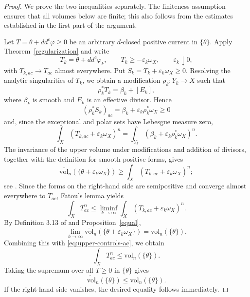 \documentclass[10pt,a4paper]{amsart}
\begin{document}
\begin{proof}
We prove the two inequalities separately. The finiteness assumption ensures that all volumes below are finite; this also follows from the estimates established in the first part of the argument.

Let $T=\theta+dd^c\varphi\ge0$ be an arbitrary $d$-closed positive current in
$\{\theta\}$. Apply Theorem~\ref{regularization} and write
\[
 T_k=\theta+dd^c\varphi_k,\qquad
 T_k\ge-\varepsilon_k\omega_X,\qquad
 \varepsilon_k\downarrow0,
\]
with $T_{k,ac}\to T_{ac}$ almost everywhere. Put
$S_k=T_k+\varepsilon_k\omega_X\ge0$. Resolving the analytic singularities of
$T_k$, we obtain a modification $\rho_k:Y_k\to X$ such that
\[
 \rho_k^*T_k=\beta_k+[E_k],
\]
where $\beta_k$ is smooth and $E_k$ is an effective divisor. Hence
\[
 (\rho_k^*S_k)_{ac}=\beta_k+\varepsilon_k\rho_k^*\omega_X\ge0
\]
and, since the exceptional and polar sets have Lebesgue measure zero,
\begin{equation}\label{eq:regularized-ac-mass}
 \int_X(T_{k,ac}+\varepsilon_k\omega_X)^n
 =\int_{Y_k}(\beta_k+\varepsilon_k\rho_k^*\omega_X)^n.
\end{equation}
The invariance of the upper volume under modifications and addition of divisors, together with the definition for smooth positive forms, gives
\begin{equation}\label{eq:upper-controls-ac}
 \overline{\mathrm{vol}}_n(\{\theta+\varepsilon_k\omega_X\})
 \ge \int_X(T_{k,ac}+\varepsilon_k\omega_X)^n;
\end{equation}
see \cite[Lemma 3.5 and Definition 3.8]{BGL}. Since the forms on the right-hand
side are semipositive and converge almost everywhere to $T_{ac}$, Fatou's lemma
yields
\[
 \int_XT_{ac}^n
 \le\liminf_{k\to\infty}
 \int_X(T_{k,ac}+\varepsilon_k\omega_X)^n.
\]
By Definition 3.13 of \cite{BGL} and Proposition~\ref{equal},
\[
 \lim_{k\to\infty}
 \overline{\mathrm{vol}}_n(\{\theta+\varepsilon_k\omega_X\})
 =\mathrm{vol}_n(\{\theta\}).
\]
Combining this with \eqref{eq:upper-controls-ac}, we obtain
\[
 \int_XT_{ac}^n\le\mathrm{vol}_n(\{\theta\}).
\]
Taking the supremum over all $T\ge0$ in $\{\theta\}$ gives
\begin{equation}\label{eq:tilde-le-volume}
 \widetilde{\mathrm{vol}}_n(\{\theta\})
 \le\mathrm{vol}_n(\{\theta\}).
\end{equation}
If the right-hand side vanishes, the desired equality follows immediately.


\end{proof}
\end{document}
